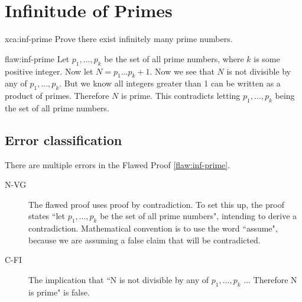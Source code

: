 \section{Infinitude of Primes}

\begin{xca}{xca:inf-prime}
Prove there exist infinitely many prime numbers.  
\end{xca}

\begin{flaw}{flaw:inf-prime} %
Let $p_1, ..., p_k$ be the set of all prime numbers, where $k$ is some positive integer. Now let $N = p_1...p_k + 1$. Now we see that $N$ is not divisible by any of $p_1, ..., p_k$. But we know all integers greater than 1 can be written as a product of primes. Therefore $N$ is prime. This contradicts letting $p_1, ..., p_k$ being the set of all prime numbers. 
\end{flaw}

\clearpage
\subsection{Error classification}


There are multiple errors
 in the Flawed Proof \ref{flaw:inf-prime}. %

 
 \begin{description}
    \item[N-VG]  The flawed proof uses proof by contradiction. To set this up, the proof states ``let $p_1, ..., p_k$ be the set of all prime numbers", intending to derive a contradiction. Mathematical convention is to use the word ``assume", because we are assuming a false claim that will be contradicted.  
    \item[C-FI]  The implication that ``N is not divisible by any of $p_1, ..., p_k$ ... Therefore N is prime" is false.  
 	
 \end{description}

